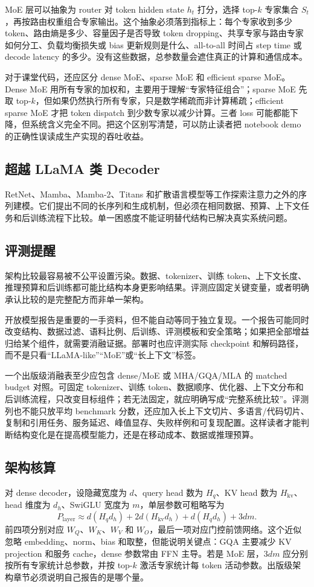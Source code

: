 \documentclass[UTF8,zihao=-4,openany]{ctexbook}
\begin{document}
MoE 层可以抽象为 router 对 token hidden state $h_t$ 打分，选择 top-$k$ 专家集合 $S_t$，再按路由权重组合专家输出。这个抽象必须落到指标上：每个专家收到多少 token、路由熵是多少、容量因子是否导致 token dropping、共享专家与路由专家如何分工、负载均衡损失或 bias 更新规则是什么、all-to-all 时间占 step time 或 decode latency 的多少。没有这些数据，总参数量会遮住真正的计算和通信成本。

对于课堂代码，还应区分 dense MoE、sparse MoE 和 efficient sparse MoE。Dense MoE 用所有专家的加权和，主要用于理解“专家特征组合”；sparse MoE 先取 top-$k$，但如果仍然执行所有专家，只是数学稀疏而非计算稀疏；efficient sparse MoE 才把 token dispatch 到少数专家以减少计算。三者 loss 可能都能下降，但系统含义完全不同。把这个区别写清楚，可以防止读者把 notebook demo 的正确性误读成生产实现的吞吐收益。

\subsection{超越 LLaMA 类 Decoder}
RetNet、Mamba、Mamba-2、Titans 和扩散语言模型等工作探索注意力之外的序列建模。它们提出不同的长序列和生成机制，但必须在相同数据、预算、上下文任务和后训练流程下比较。单一困惑度不能证明替代结构已解决真实系统问题。

\subsection{评测提醒}
架构比较最容易被不公平设置污染。数据、tokenizer、训练 token、上下文长度、推理预算和后训练都可能比结构本身更影响结果。评测应固定关键变量，或者明确承认比较的是完整配方而非单一架构。

开放模型报告是重要的一手资料，但不能自动等同于独立复现。一个报告可能同时改变结构、数据过滤、语料比例、后训练、评测模板和安全策略；如果把全部增益归给某个组件，就需要消融证据。部署时也应评测实际 checkpoint 和解码路径，而不是只看“LLaMA-like”“MoE”或“长上下文”标签。

一个出版级消融表至少应包含 dense/MoE 或 MHA/GQA/MLA 的 matched budget 对照。可固定 tokenizer、训练 token、数据顺序、优化器、上下文分布和后训练流程，只改变目标组件；若无法固定，就应明确写成“完整系统比较”。评测列也不能只放平均 benchmark 分数，还应加入长上下文切片、多语言/代码切片、复制和引用任务、服务延迟、峰值显存、失败样例和可复现配置。这样读者才能判断结构变化是在提高模型能力，还是在移动成本、数据或推理预算。

\subsection{架构核算}
对 dense decoder，设隐藏宽度为 $d$、query head 数为 $H_q$、KV head 数为 $H_{\mathrm{kv}}$、head 维度为 $d_h$、SwiGLU 宽度为 $m$，单层参数可粗略写为
\[
  P_{\mathrm{layer}}
  \approx
  d(H_qd_h)+2d(H_{\mathrm{kv}}d_h)+d(H_qd_h)+3dm .
\]
前四项分别对应 $W_Q$、$W_K$、$W_V$ 和 $W_O$，最后一项对应门控前馈网络。这个近似忽略 embedding、norm、bias 和取整，但能说明关键点：GQA 主要减少 KV projection 和服务 cache，dense 参数常由 FFN 主导。若是 MoE 层，$3dm$ 应分别按所有专家统计总参数，并按 top-$k$ 激活专家统计每 token 活动参数。出版级架构章节必须说明自己报告的是哪个量。
\end{document}
